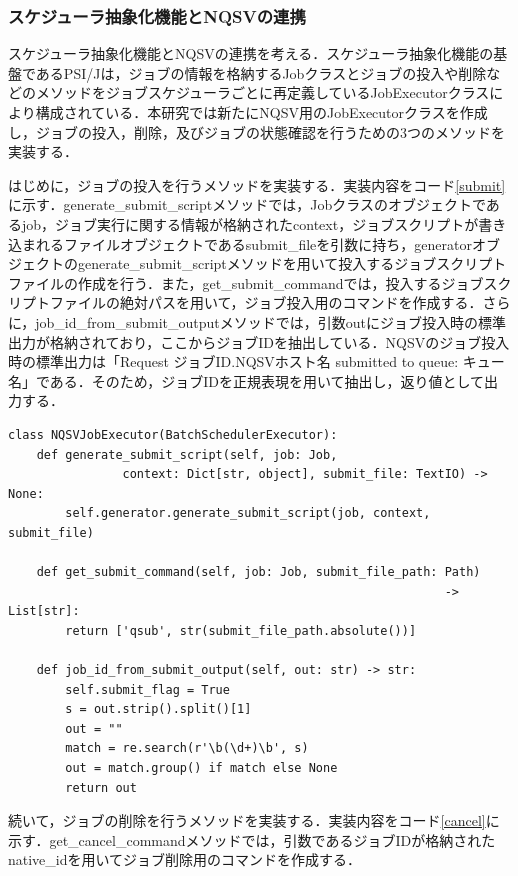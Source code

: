 \subsubsection{スケジューラ抽象化機能とNQSVの連携}
スケジューラ抽象化機能とNQSVの連携を考える．スケジューラ抽象化機能の基盤であるPSI/Jは，ジョブの情報を格納するJobクラスとジョブの投入や削除などのメソッドをジョブスケジューラごとに再定義しているJobExecutorクラスにより構成されている．本研究では新たにNQSV用のJobExecutorクラスを作成し，ジョブの投入，削除，及びジョブの状態確認を行うための3つのメソッドを実装する．\par

はじめに，ジョブの投入を行うメソッドを実装する．実装内容をコード\ref{submit}に示す．generate\_submit\_scriptメソッドでは，Jobクラスのオブジェクトであるjob，ジョブ実行に関する情報が格納されたcontext，ジョブスクリプトが書き込まれるファイルオブジェクトであるsubmit\_fileを引数に持ち，generatorオブジェクトのgenerate\_submit\_scriptメソッドを用いて投入するジョブスクリプトファイルの作成を行う．また，get\_submit\_commandでは，投入するジョブスクリプトファイルの絶対パスを用いて，ジョブ投入用のコマンドを作成する．さらに，job\_id\_from\_submit\_outputメソッドでは，引数outにジョブ投入時の標準出力が格納されており，ここからジョブIDを抽出している．NQSVのジョブ投入時の標準出力は「Request ジョブID.NQSVホスト名 submitted to queue: キュー名」である．そのため，ジョブIDを正規表現を用いて抽出し，返り値として出力する．\par

\begin{lstlisting}[caption=ジョブの投入メソッド, label=submit]
class NQSVJobExecutor(BatchSchedulerExecutor):
    def generate_submit_script(self, job: Job, 
                context: Dict[str, object], submit_file: TextIO) -> None:
        self.generator.generate_submit_script(job, context, submit_file)

    def get_submit_command(self, job: Job, submit_file_path: Path)
                                                             -> List[str]:
        return ['qsub', str(submit_file_path.absolute())]

    def job_id_from_submit_output(self, out: str) -> str:
        self.submit_flag = True
        s = out.strip().split()[1]
        out = ""
        match = re.search(r'\b(\d+)\b', s)
        out = match.group() if match else None
        return out
\end{lstlisting}

続いて，ジョブの削除を行うメソッドを実装する．実装内容をコード\ref{cancel}に示す．get\_cancel\_commandメソッドでは，引数であるジョブIDが格納されたnative\_idを用いてジョブ削除用のコマンドを作成する．\par

